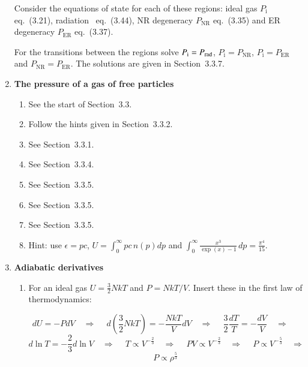 \documentclass[11pt,a4paper]{report}
\begin{document}
\begin{enumerate}
  Consider the equations of state for each of these regions: ideal gas
  $P_\mathrm{i}$ eq.~(3.21), radiation \Prad\ eq.~(3.44), NR degeneracy
  $P_\mathrm{NR}$ eq.~(3.35) and ER degeneracy $P_\mathrm{ER}$
  eq.~(3.37).

  For the transitions between the regions solve $P_\mathrm{i} =
  P_\mathrm{rad}$, $P_\mathrm{i} = P_\mathrm{NR}$, $P_\mathrm{i} =
  P_\mathrm{ER}$ and $P_\mathrm{NR} = P_\mathrm{ER}$.  The solutions
  are given in Section~3.3.7.

\item {\bf The pressure of a gas of free particles}

  \begin{enumerate}

  \item See the start of Section~3.3.

  \item Follow the hints given in Section~3.3.2.

  \item See Section~3.3.1.

  \item See Section~3.3.4.

  \item See Section~3.3.5.

  \item See Section~3.3.5.

  \item See Section~3.3.5.

  \item Hint: use $\epsilon = pc$, $U = \int_0^\infty pc\, n(p)dp$ and
    $\displaystyle \int_0^\infty \frac{x^3}{\exp(x) - 1}\,dp =
    \frac{\pi^4}{15}$.

  \end{enumerate}

\newpage
\item {\bf Adiabatic derivatives}

  \begin{enumerate}

  \item For an ideal gas $U =\frac{3}{2}NkT$ and $P = NkT/V$.  Insert
    these in the first law of thermodynamics:

    \[
      dU = - PdV  \quad\Rightarrow\quad\
      d(\frac{3}{2}N k T) = -\frac{N k T}{V}dV  \quad\Rightarrow\quad\
      \frac{3}{2} \frac{dT}{T} = - \frac{dV}{V} \quad\Rightarrow\quad\
    \]
    \[
      d\ln T = -\frac{2}{3} d \ln V   \quad\Rightarrow\quad\
      T \propto V^{-\frac{2}{3}}   \quad\Rightarrow\quad\
      P V \propto V^{-\frac{2}{3}}  \quad\Rightarrow\quad\
      P \propto V^{-\frac{5}{3}}  \quad\Rightarrow\quad\
    \]
    \begin{equation}
      P \propto \rho^{\frac{5}{3}}
    \end{equation}
   

\end{enumerate}
\end{enumerate}
\end{document}
